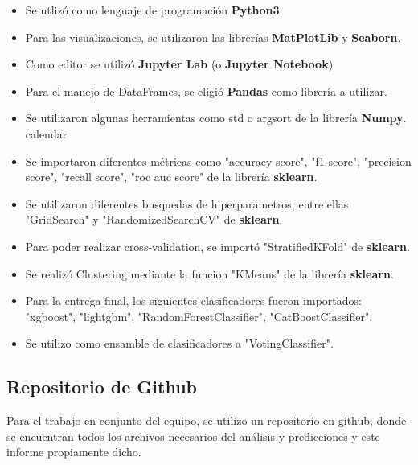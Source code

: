 \documentclass[a4paper ,12pt]{article}
\begin{document}
\begin{itemize}
	
	\item Se utlizó como lenguaje de programación \textbf{Python3}.
	
	\item Para las visualizaciones, se utilizaron las librerías \textbf{ MatPlotLib }y\textbf{ Seaborn}.
	
	\item Como editor se utilizó \textbf{Jupyter Lab} (o \textbf{Jupyter Notebook})
	
	\item Para el manejo de DataFrames, se eligió \textbf{Pandas} como librería a utilizar.

	\item Se utilizaron algunas herramientas como std o argsort de la librería \textbf{Numpy}.
	calendar
	
	\item Se importaron diferentes métricas como "accuracy score", "f1 score", "precision score", "recall score", "roc auc score" de la librería \textbf{sklearn}.
	
	\item Se utilizaron diferentes busquedas de hiperparametros, entre ellas  "GridSearch" y "RandomizedSearchCV"  de \textbf{sklearn}.
	
	\item Para poder realizar cross-validation, se importó "StratifiedKFold" de \textbf{sklearn}.

	\item Se realizó Clustering mediante la funcion "KMeans" de la librería \textbf{sklearn}.
	
	\item Para la entrega final, los siguientes clasificadores fueron importados: 	"xgboost", "lightgbm", "RandomForestClassifier", "CatBoostClassifier".
	
	\item Se utilizo como ensamble de clasificadores a "VotingClassifier".
	
\end{itemize}

\subsection{Repositorio de Github}

Para el trabajo en conjunto del equipo, se utilizo un repositorio en github, donde se encuentran todos los archivos necesarios del análisis y predicciones y este informe propiamente dicho.\\
\end{document}
